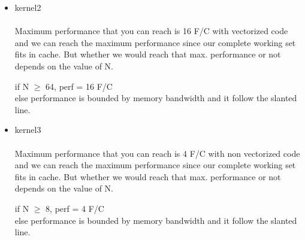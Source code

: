 \documentclass[letterpaper, 11pt]{article}
\begin{document}
\begin{itemize}
\begin{itemize}
\item kernel2 \\ \\
Maximum performance that you can reach is 16 F/C with vectorized code and we can reach the maximum performance since our complete working set fits in cache. But whether we would reach that max. performance or not depends on the value of N.
\begin{center}
if N $\geq$ 64, perf = 16 F/C \\
else performance is bounded by memory bandwidth and it follow the slanted line.
\end{center}
\item kernel3 \\ \\
Maximum performance that you can reach is 4 F/C with non vectorized code and we can reach the maximum performance since our complete working set fits in cache. But whether we would reach that max. performance or not depends on the value of N.
\begin{center}
if N $\geq$ 8, perf = 4 F/C \\
else performance is bounded by memory bandwidth and it follow the slanted line.
\end{center}
\end{itemize}
\end{itemize}
\end{document}
